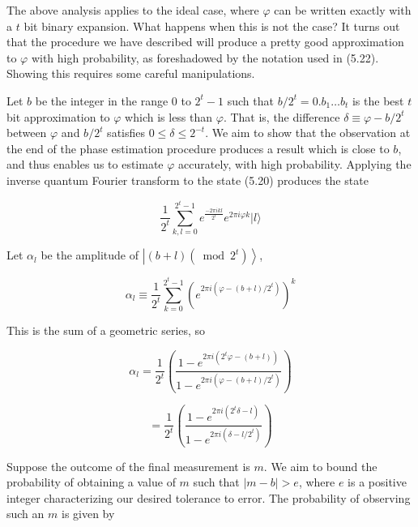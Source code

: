 The above analysis applies to the ideal case, where $\varphi$ can be written exactly with a $t$ bit binary expansion. What happens when this is not the case? It turns out that the procedure we have described will produce a pretty good approximation to $\varphi$ with high probability, as foreshadowed by the notation used in (5.22). Showing this requires some careful manipulations.

Let $b$ be the integer in the range 0 to $2^{t}-1$ such that $b / 2^{t}=0 . b_{1} \ldots b_{t}$ is the best $t$ bit approximation to $\varphi$ which is less than $\varphi$. That is, the difference $\delta \equiv \varphi-b / 2^{t}$ between $\varphi$ and $b / 2^{t}$ satisfies $0 \leq \delta \leq 2^{-t}$. We aim to show that the observation at the end of the phase estimation procedure produces a result which is close to $b$, and thus enables us to estimate $\varphi$ accurately, with high probability. Applying the inverse quantum Fourier transform to the state (5.20) produces the state

\begin{equation*}
\frac{1}{2^{t}} \sum_{k, l=0}^{2^{t}-1} e^{\frac{-2 \pi i k l}{2^{t}}} e^{2 \pi i \varphi k}|l\rangle \tag{5.23}
\end{equation*}

Let $\alpha_{l}$ be the amplitude of $\left|(b+l)\left(\bmod 2^{t}\right)\right\rangle$,

\begin{equation*}
\alpha_{l} \equiv \frac{1}{2^{t}} \sum_{k=0}^{2^{t}-1}\left(e^{2 \pi i\left(\varphi-(b+l) / 2^{t}\right)}\right)^{k} \tag{5.24}
\end{equation*}

This is the sum of a geometric series, so

\begin{equation*}
\alpha_{l}=\frac{1}{2^{t}}\left(\frac{1-e^{2 \pi i\left(2^{t} \varphi-(b+l)\right)}}{1-e^{2 \pi i\left(\varphi-(b+l) / 2^{t}\right)}}\right) \tag{5.25}
\end{equation*}

\begin{equation*}
=\frac{1}{2^{t}}\left(\frac{1-e^{2 \pi i\left(2^{t} \delta-l\right)}}{1-e^{2 \pi i\left(\delta-l / 2^{t}\right)}}\right) \tag{5.26}
\end{equation*}

Suppose the outcome of the final measurement is $m$. We aim to bound the probability of obtaining a value of $m$ such that $|m-b|>e$, where $e$ is a positive integer characterizing our desired tolerance to error. The probability of observing such an $m$ is given by

